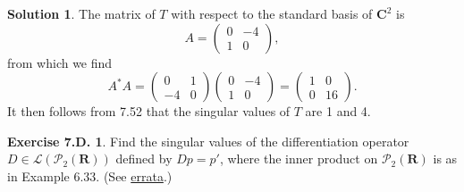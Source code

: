 \documentclass[12pt]{article}
\theoremstyle{definition}
\theoremstyle{exercise}
\newtheorem{exercise}{Exercise 7.D.}
\theoremstyle{solution}
\newtheorem*{solution}{Solution}
\newcommand{\poly}{\mathcal{P}}
\newcommand{\lmap}{\mathcal{L}}
\newcommand{\R}{\mathbf{R}}
\newcommand{\C}{\mathbf{C}}
\begin{document}
\begin{solution}
    The matrix of \( T \) with respect to the standard basis of \( \C^2 \) is
    \[
        A = \begin{pmatrix}
            0 & -4 \\
            1 & 0
        \end{pmatrix},
    \]
    from which we find
    \[
        A^* A = \begin{pmatrix}
            0 & 1 \\
            -4 & 0
        \end{pmatrix}
        \begin{pmatrix}
            0 & -4 \\
            1 & 0
        \end{pmatrix}
        =
        \begin{pmatrix}
            1 & 0 \\
            0 & 16
        \end{pmatrix}.
    \]
    It then follows from 7.52 that the singular values of \( T \) are 1 and 4.
\end{solution}

\begin{exercise}
\label{ex:6}
    Find the singular values of the differentiation operator \( D \in \lmap(\poly_2(\R)) \) defined by \( Dp = p' \), where the inner product on \( \poly_2(\R) \) is as in Example 6.33. (See \href{https://linear.axler.net/LADRErrataThird.html}{errata}.)
\end{exercise}
\end{document}
